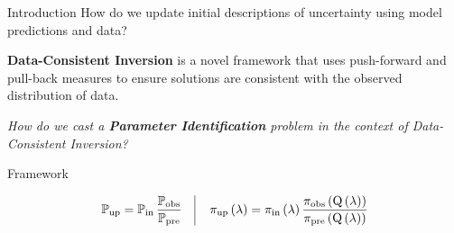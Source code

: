 \begin{block}{Introduction}
\centering
            {\large How do we update initial descriptions of uncertainty using model predictions and data?}

             {\large \textbf{Data-Consistent Inversion} is a novel framework that uses push-forward and pull-back measures to ensure solutions are consistent with the observed distribution of data.}

             {\large \emph{How do we cast a \textbf{Parameter Identification} problem in the context of Data-Consistent Inversion?} }

\end{block}

\begin{block}{Framework}

\centering
\vspace{1cm}
    \begin{equation*}
            \dciP \quad \vline \quad \dci
    \end{equation*}

\end{block}

